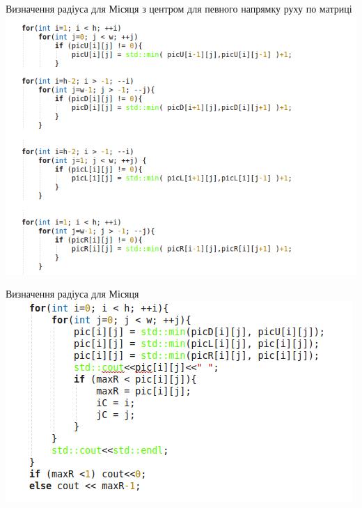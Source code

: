 \documentclass{beamer}
\begin{document}
\begin{frame}{Визначення радіуса для Місяця з центром для певного напрямку руху по матриці}
\includegraphics[scale=0.4]{MinimumLocal.png}
\end{frame}

\begin{frame}{Визначення радіуса для Місяця}
\includegraphics[scale=0.5]{MinimumGlobal.png}
\end{frame}
\end{document}
